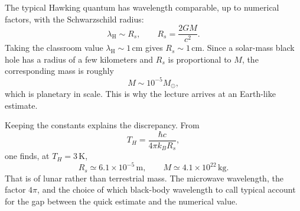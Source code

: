 \begin{classroomqa}
\end{classroomqa}

The typical Hawking quantum has wavelength comparable, up to numerical factors, with the Schwarzschild radius:
\begin{equation}
\lambda_{\mathrm{H}}\sim R_s,
\qquad
R_s=\frac{2GM}{c^2}.
\label{eq:l05-scale}
\end{equation}
Taking the classroom value \(\lambda_{\mathrm H}\sim1\,\mathrm{cm}\) gives \(R_s\sim1\,\mathrm{cm}\). Since a solar-mass black hole has a radius of a few kilometers and \(R_s\) is proportional to \(M\), the corresponding mass is roughly
\begin{equation}
M\sim10^{-5}M_\odot,
\label{eq:l05-rough-mass}
\end{equation}
which is planetary in scale. This is why the lecture arrives at an Earth-like estimate.

\begin{classroomqa}
\end{classroomqa}

Keeping the constants explains the discrepancy. From
\begin{equation}
T_H=\frac{\hbar c}{4\pi k_B R_s},
\end{equation}
one finds, at \(T_H=3\,\mathrm{K}\),
\begin{equation}
R_s\simeq6.1\times10^{-5}\,\mathrm{m},
\qquad
M\simeq4.1\times10^{22}\,\mathrm{kg}.
\label{eq:l05-three-kelvin}
\end{equation}
That is of lunar rather than terrestrial mass. The microwave wavelength, the factor \(4\pi\), and the choice of which black-body wavelength to call typical account for the gap between the quick estimate and the numerical value.

